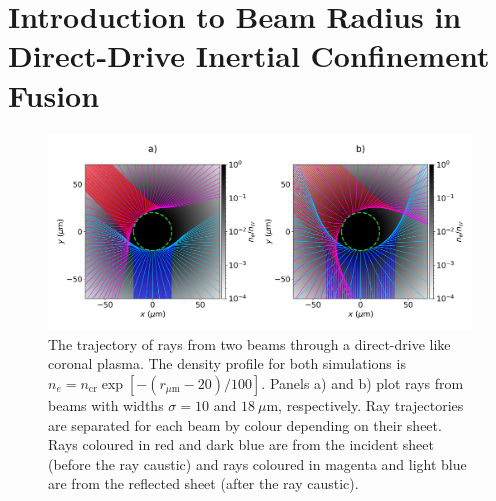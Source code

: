 \newpage

\section{Introduction to Beam Radius in Direct-Drive Inertial Confinement Fusion}%
\label{sec:Res1_Beamrad_intro}

\begin{figure}[t!]
    \includegraphics[width=\linewidth]{Results1/Images/RbRt_beam_overlap_alt.png}
    \centering
    \caption{The trajectory of rays from two beams through a direct-drive like coronal plasma.
    The density profile for both simulations is $n_e=n_{\text{cr}}\exp{[ -(r_{\mu\text{m}}-20)/100 ]}$.
    Panels a) and b) plot rays from beams with widths $\sigma=10$ and $18\ \mu\text{m}$, respectively.
    Ray trajectories are separated for each beam by colour depending on their sheet.
    Rays coloured in red and dark blue are from the incident sheet (before the ray caustic) and rays coloured in magenta and light blue are from the reflected sheet (after the ray caustic).}%
    \label{fig:Res1_RbRt_beam_overlap}
\end{figure}

